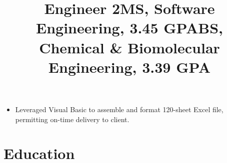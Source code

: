 \documentclass[12pt]{res} %
\begin{document}
\begin{resume}
        \title{\textbf{Engineer 2}}
        \begin{position}
          \vspace{-14pt}
          \begin{itemize}[leftmargin=-0.4cm, rightmargin=0.8cm]
          \itemsep0em
              \item Leveraged Visual Basic to assemble and format 120-sheet Excel file, permitting on-time delivery to client.
          \end{itemize}
        \end{position}
        \vspace{-10pt}

        \section{Education}
        \vspace{2pt}

        \title{\textbf{MS, Software Engineering, 3.45 GPA}}
        \begin{position}
            \vspace{-14pt}
        \end{position}
        \vspace{-10pt}

        \title{\textbf{BS, Chemical \& Biomolecular Engineering, 3.39 GPA}}
        \begin{position}
          \vspace{-14pt}
        \end{position}
        \vspace{-10pt}


\end{resume}
\end{document}
